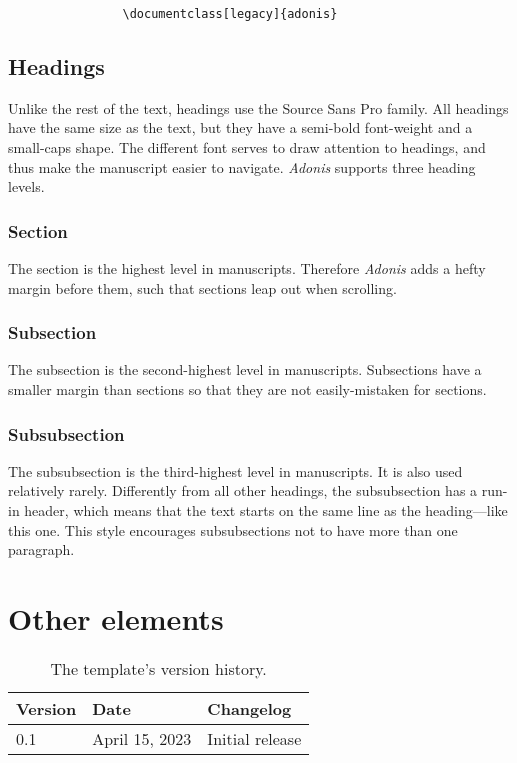\documentclass{adonis}
\begin{document}
			\begin{verbatim}
				\documentclass[legacy]{adonis}
			\end{verbatim}

		\subsection{Headings}
		
			Unlike the rest of the text, headings use the Source Sans Pro family.
			All headings have the same size as the text, but they have a semi-bold font-weight and a small-caps shape.
			The different font serves to draw attention to headings, and thus make the manuscript easier to navigate.
			\textit{Adonis} supports three heading levels.
		
			\subsubsection{Section}
			
				The section is the highest level in manuscripts.
				Therefore \textit{Adonis} adds a hefty margin before them, such that sections leap out when scrolling.
			
			\subsubsection{Subsection}
			
				The subsection is the second-highest level in manuscripts.
				Subsections have a smaller margin than sections so that they are not easily-mistaken for sections.
			
			\subsubsection{Subsubsection}
			
				The subsubsection is the third-highest level in manuscripts.
				It is also used relatively rarely.
				Differently from all other headings, the subsubsection has a run-in header, which means that the text starts on the same line as the heading—like this one.
				This style encourages subsubsections not to have more than one paragraph.
			
	\section{Other elements}
	
		\begin{table*}[t!]
			\begin{tabularx}{\linewidth}{ l l X }
				\textbf{Version} & \textbf{Date} & \textbf{Changelog} \\ \hline
				0.1 & April 15, 2023 & Initial release \\
			\end{tabularx}
			\caption{The template's version history.}
			\label{"Table: version history"}
		\end{table*}
	
\end{document}
